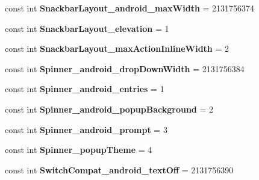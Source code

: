 \begin{DoxyCompactItemize}
const int {\bfseries Snackbar\+Layout\+\_\+android\+\_\+max\+Width} = 2131756374
\item 
\mbox{\label{classst_delivery_1_1_resource_1_1_styleable_abf5f16cb9748ba34af368d08f3994810}} 
const int {\bfseries Snackbar\+Layout\+\_\+elevation} = 1
\item 
\mbox{\label{classst_delivery_1_1_resource_1_1_styleable_ae55171dafee24c00222eaad60205f0e1}} 
const int {\bfseries Snackbar\+Layout\+\_\+max\+Action\+Inline\+Width} = 2
\item 
\mbox{\label{classst_delivery_1_1_resource_1_1_styleable_a28cb2ee8b41e4f1c44ddac21bd65c43e}} 
const int {\bfseries Spinner\+\_\+android\+\_\+drop\+Down\+Width} = 2131756384
\item 
\mbox{\label{classst_delivery_1_1_resource_1_1_styleable_adf4a3fbb1e30568248c7bc62c9a58acf}} 
const int {\bfseries Spinner\+\_\+android\+\_\+entries} = 1
\item 
\mbox{\label{classst_delivery_1_1_resource_1_1_styleable_ad662e238b1565bdc77b9fbb7fa69133a}} 
const int {\bfseries Spinner\+\_\+android\+\_\+popup\+Background} = 2
\item 
\mbox{\label{classst_delivery_1_1_resource_1_1_styleable_ac58a52f61ca7eadeeeded3a1b1ff8dcd}} 
const int {\bfseries Spinner\+\_\+android\+\_\+prompt} = 3
\item 
\mbox{\label{classst_delivery_1_1_resource_1_1_styleable_aff00484ef7c9b3f719e711ec0461cda4}} 
const int {\bfseries Spinner\+\_\+popup\+Theme} = 4
\item 
\mbox{\label{classst_delivery_1_1_resource_1_1_styleable_ad6933ea8853a20598b69509526966adf}} 
const int {\bfseries Switch\+Compat\+\_\+android\+\_\+text\+Off} = 2131756390
\item 
\mbox{\label{classst_delivery_1_1_resource_1_1_styleable_adf637d6ef31356655d45e8a83fdf67d5}} 

\end{DoxyCompactItemize}
